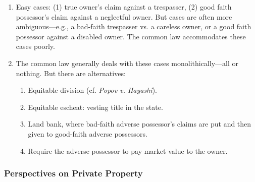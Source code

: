 \begin{enumerate}
    \item Easy cases: (1) true owner's claim against a trespasser, (2) good 
    faith possessor's claim against a neglectful owner. But cases are often 
    more ambiguous---e.g., a bad-faith trespasser vs. a careless owner, or a 
    good faith possessor against a disabled owner. The common law accommodates 
    these cases poorly.
    \item The common law generally deals with these cases monolithically---all 
    or nothing. But there are alternatives:
    \begin{enumerate}
        \item Equitable division (cf. \emph{Popov v. Hayashi}).
        \item Equitable escheat: vesting title in the state.
        \item Land bank, where bad-faith adverse possessor's claims are put 
        and then given to good-faith adverse possessors.
        \item Require the adverse possessor to pay market value to the owner.
    \end{enumerate}
\end{enumerate}

\subsubsection{Perspectives on Private Property}

